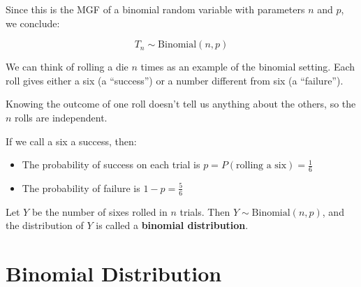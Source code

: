 Since this is the MGF of a binomial random variable with parameters \( n \) and \( p \), we conclude:

\[
T_n \sim \text{Binomial}(n, p)
\]
\medskip
\begin{tcolorbox}[title=Example: Binomial Distribution from Die Rolls,
  colback=blue!5, colframe=blue!40!black, coltitle=black,
  colbacktitle=blue!10!white, fonttitle=\bfseries, breakable]

We can think of rolling a die \( n \) times as an example of the binomial setting. Each roll gives either a six (a “success”) or a number different from six (a “failure”).

Knowing the outcome of one roll doesn’t tell us anything about the others, so the \( n \) rolls are independent.

If we call a six a success, then:
\begin{itemize}
  \item The probability of success on each trial is \( p = P(\text{rolling a six}) = \frac{1}{6} \)
  \item The probability of failure is \( 1 - p = \frac{5}{6} \)
\end{itemize}

Let \( Y \) be the number of sixes rolled in \( n \) trials. Then \( Y \sim \text{Binomial}(n, p) \), and the distribution of \( Y \) is called a \textbf{binomial distribution}.
\end{tcolorbox}


\section{Binomial Distribution} %

